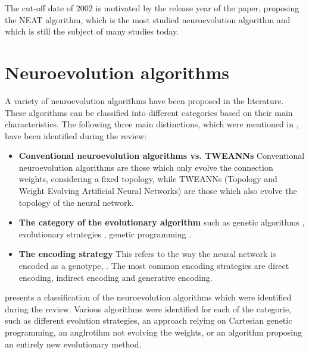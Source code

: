 The cut-off date of 2002 is motivated by the release year of the \cite{neat} paper, proposing the NEAT algorithm, which is the most studied neuroevolution algorithm and which
is still the subject of many studies today.

\section{Neuroevolution algorithms}

A variety of neuroevolution algorithms have been proposed in the literature.
These algorithms can be classified into different categories based on their main characteristics.
The following three main distinctions, which were mentioned in , have been identified during the review:

\begin{itemize}
    \item \textbf{Conventional neuroevolution algorithms vs. TWEANNs} Conventional neuroevolution algorithms are those which only evolve the connection weights,
        considering a fixed topology, while TWEANNs (Topology and Weight Evolving Artificial Neural Networks) \cite{neat} are those which also evolve the topology of the
        neural network.
    \item \textbf{The category of the evolutionary algorithm} such as genetic algorithms \cite{genetic_alg,genetic_alg_review}, evolutionary strategies \cite{es_intro},
        genetic programming \cite{cartesian_gp}.
    \item \textbf{The encoding strategy} This refers to the way the neural network is encoded as a genotype, \cite{neuroevolution_learning,neuroevolution_trends,neuroevolution_survey}.
        The most common encoding strategies are direct encoding, indirect encoding and generative encoding.
\end{itemize}

 presents a classification of the neuroevolution algorithms which were identified during the review.
Various algorithms were identified for each of the categorie, such as different evolution strategies, an approach relying on Cartesian genetic programming, an anglrotihm not evolving the
weights, or an algorithm proposing an entirely new evolutionary method.

